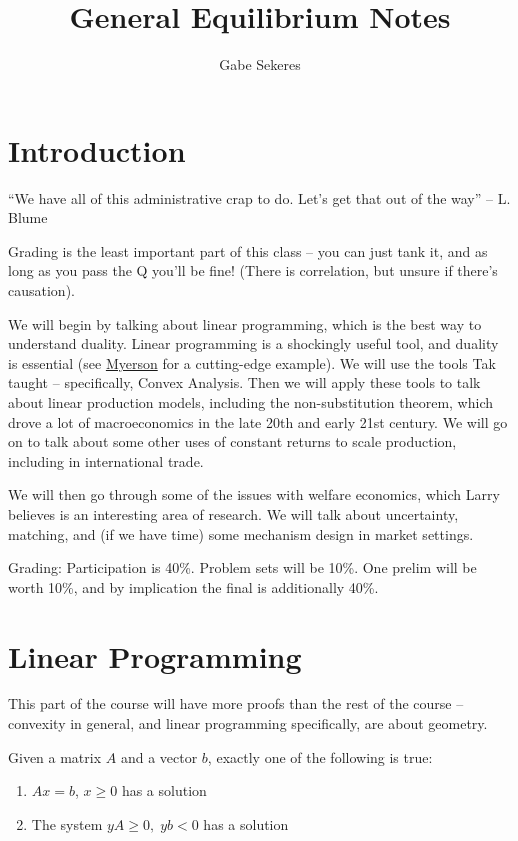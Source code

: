 \documentclass[10pt]{article}
\title{General Equilibrium Notes}
\author{Gabe Sekeres}
\begin{document}
\maketitle

\tableofcontents
\newpage


\section*{Introduction}
\begin{center}
``We have all of this administrative crap to do. Let's get that out of the way'' -- L. Blume
\end{center}

Grading is the least important part of this class -- you can just tank it, and as long as you pass the Q you'll be fine! (There is correlation, but unsure if there's causation). 

We will begin by talking about linear programming, which is the best way to understand duality. Linear programming is a shockingly useful tool, and duality is essential (see \href{https://home.uchicago.edu/~rmyerson/research/eldual2023notes.pdf}{Myerson} for a cutting-edge example). We will use the tools Tak taught -- specifically, Convex Analysis. Then we will apply these tools to talk about linear production models, including the non-substitution theorem, which drove a lot of macroeconomics in the late 20th and early 21st century. We will go on to talk about some other uses of constant returns to scale production, including in international trade. 

We will then go through some of the issues with welfare economics, which Larry believes is an interesting area of research. We will talk about uncertainty, matching, and (if we have time) some mechanism design in market settings.

Grading: Participation is 40\%. Problem sets will be 10\%. One prelim will be worth 10\%, and by implication the final is additionally 40\%.

\section{Linear Programming}

This part of the course will have more proofs than the rest of the course -- convexity in general, and linear programming specifically, are about geometry. 

\begin{lemma}
	 Given a matrix $A$ and a vector $b$, exactly one of the following is true:
	\begin{enumerate}
		\item $Ax = b$, $x \ge 0$ has a solution
		\item The system $yA \ge 0,\; yb < 0$ has a solution
	\end{enumerate}
\end{lemma}
\end{document}
